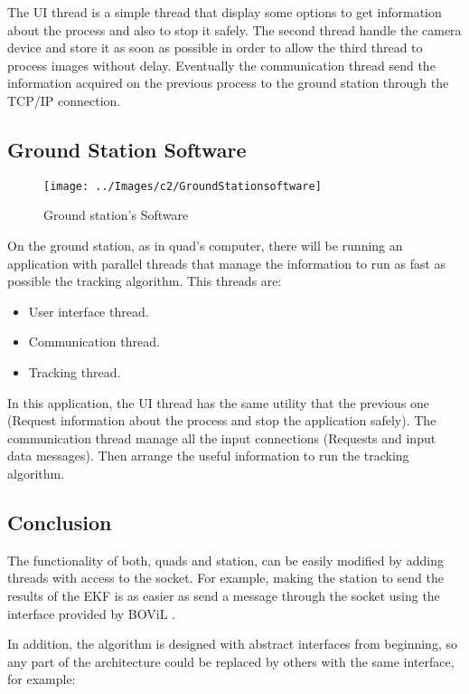 	The UI thread is a simple thread that display some options to get information about the process and also to stop it safely. The second thread handle the camera device and store it as soon as possible in order to allow the third thread to process images without delay. Eventually the communication thread send the information acquired on the previous process to the ground station through the TCP/IP connection.
	
\subsection{Ground Station Software}
	\begin{figure}[hp]
		\begin{center}
			\texttt{[image: ../Images/c2/GroundStationsoftware]}
		\end{center}
		\caption{Ground station's Software}
		\label{fig:GroundStation}
	\end{figure}

	On the ground station, as in quad's computer, there will be running an application with parallel threads that manage the information to run as fast as possible the tracking algorithm. This threads are:

	\begin{itemize}
		\item User interface thread.
		\item Communication thread.
		\item Tracking thread.
	\end{itemize}

	In this application, the UI thread has the same utility that the previous one (Request information about the process and stop the application safely). The communication thread manage all the input connections (Requests and input data messages). Then arrange the useful information to run the tracking algorithm.
	
\subsection{Conclusion}
The functionality of both, quads and station, can be easily modified by adding threads with access to the socket. For example, making the station to send the results of the EKF is as easier as send a message through the socket using the interface provided by BOViL \cite{BOViL}. 

In addition, the algorithm is designed with abstract interfaces from beginning, so any part of the architecture could be replaced by others with the same interface, for example:

